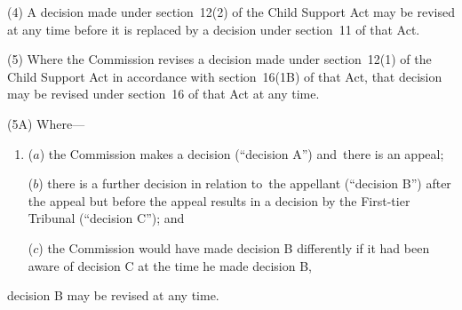 \documentclass[12pt,a4paper]{article}
\begin{document}
{(4) A decision made under section~12(2) of the Child Support Act may be revised at any time before it is replaced by a decision under section~11 of that Act.

(5) Where the 
Commission  %
revises a decision made under section~12(1) of the Child Support Act in accordance with section~16(1B) of that Act, that decision may be revised under section~16 of that Act at any time.

(5A) Where—
\begin{enumerate}\item[]
($a$) the 
Commission  %
makes a decision (“decision A”) and~there is an appeal;

($b$) there is a further decision in relation to~the appellant (“decision B”) after the appeal but before the appeal results in a decision by 
the First-tier Tribunal  %
(“decision C”); and

($c$) the 
Commission  %
would have made decision B differently if 
it  %
had been aware of decision C at the time he made decision B,
\end{enumerate}
decision B may be revised at any time.

%
%

}
\end{document}
